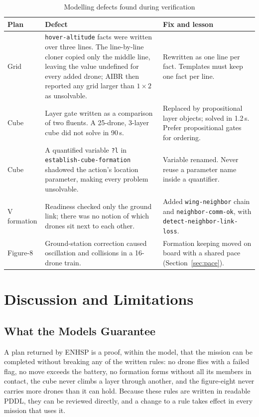 \documentclass[11pt,a4paper,oneside]{report}
\newcommand{\code}[1]{\texttt{#1}}
\begin{document}
\begin{table}[H]
\caption{Modelling defects found during verification}\label{tab:defects}
\small
\begin{tabularx}{\textwidth}{@{}P{0.2\textwidth}P{0.36\textwidth}Y@{}}
\toprule
\textbf{Plan} & \textbf{Defect} & \textbf{Fix and lesson} \\
\midrule
Grid & \code{hover-altitude} facts were written over three lines. The line-by-line cloner copied
only the middle line, leaving the value undefined for every added drone; AIBR then reported any
grid larger than $1\times2$ as unsolvable. & Rewritten as one line per fact. Templates must keep
one fact per line. \\
Cube & Layer gate written as a comparison of two fluents. A 25-drone, 3-layer cube did not solve
in 90\,s. & Replaced by propositional layer objects; solved in 1.2\,s. Prefer propositional
gates for ordering. \\
Cube & A quantified variable \code{?l} in \code{establish-cube-formation} shadowed the action's
location parameter, making every problem unsolvable. & Variable renamed. Never reuse a parameter
name inside a quantifier. \\
V formation & Readiness checked only the ground link; there was no notion of which drones sit
next to each other. & Added \code{wing-neighbor} chain and \code{neighbor-comm-ok}, with
\code{detect-neighbor-link-loss}. \\
Figure-8 & Ground-station correction caused oscillation and collisions in a 16-drone train. &
Formation keeping moved on board with a shared pace (Section~\ref{sec:pace}). \\
\bottomrule
\end{tabularx}
\end{table}

\chapter{Discussion and Limitations}\label{ch:discussion}

\section{What the Models Guarantee}
A plan returned by ENHSP is a proof, within the model, that the mission can be completed without
breaking any of the written rules: no drone flies with a failed flag, no move exceeds the battery,
no formation forms without all its members in contact, the cube never climbs a layer through
another, and the figure-eight never carries more drones than it can hold. Because these rules are
written in readable PDDL, they can be reviewed directly, and a change to a rule takes effect in
every mission that uses it.
\end{document}
